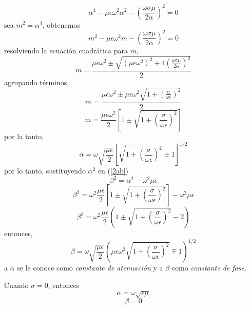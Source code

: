 \documentclass[11pt,fleqn]{book} %
\begin{document}
\begin{equation*}
 \alpha^{4}-\mu \epsilon \omega ^{2} \alpha^{2}-\left( \frac{\omega \sigma \mu}{2 \alpha} \right)^2=0
\end{equation*}
sea $m^2=\alpha^4$, obtenemos
\begin{equation*}
m^{2}-\mu\epsilon\omega^{2} m-\left( \frac{\omega\sigma\mu}{2\alpha} \right)^2=0
 \end{equation*}
resolviendo la ecuaci\'on cuadr\'atica para $m$,
\begin{equation*}
m=\frac{\mu\epsilon\omega^2\pm\sqrt{(\mu\epsilon\omega^2)^2+4\left(\frac{\omega\sigma\mu}{2\alpha}\right)^2}}{2}
 \end{equation*}
agrupando t\'erminos,
\begin{equation*}
m=\frac{\mu\epsilon\omega^2\pm\mu\epsilon\omega^2\sqrt{1+\left(\frac{\sigma}{\omega\epsilon}\right)^2}}{2}
 \end{equation*}
\begin{equation*}
m=\frac{\mu\epsilon\omega^2}{2}\left[1\pm\sqrt{1+\left(\frac{\sigma}{\omega\epsilon}\right)^2}\right]
 \end{equation*}
por la tanto,
\begin{equation}
\alpha=\omega\sqrt{\frac{\mu\epsilon}{2}}\left[ \sqrt{1+\left(\frac{\sigma}{\omega\epsilon}\right)^2} \pm 1 \right]^{1/2}
\end{equation}
por lo tanto, sustituyendo $\alpha^2$ en (\ref{2ab})
\begin{equation*}
\beta^2=\alpha^2-\omega^2\mu\epsilon
\end{equation*}
\begin{equation*}
\beta^2=\omega^2\frac{\mu\epsilon}{2}\left[ 1\pm\sqrt{1+\left(\frac{\sigma}{\omega\epsilon}\right)^2} \right]-\omega^2\mu\epsilon
\end{equation*}
\begin{equation*}
\beta^2=\omega^2\frac{\mu\epsilon}{2}\left( 1\pm\sqrt{1+\left(\frac{\sigma}{\omega\epsilon}\right)^2} -2\right)
\end{equation*}
entonces,
\begin{equation}
\beta=\omega\sqrt{\frac{\mu\epsilon}{2}}\left( \mu\epsilon\omega^2\sqrt{1+\left(\frac{\sigma}{\omega\epsilon}\right)^2} \mp 1\right)^{1/2}
\end{equation}
a $\alpha$ se le conoce como \textit{constante de atenuaci\'on} y a $\beta$ como \textit{constante de fase}.
\begin{obs}
Cuando $\sigma=0$, entonces
\begin{equation}
\alpha=\omega\sqrt{\epsilon\mu}
\end{equation}
\begin{equation}
\beta=0
\end{equation}
\end{obs}
\end{document}
